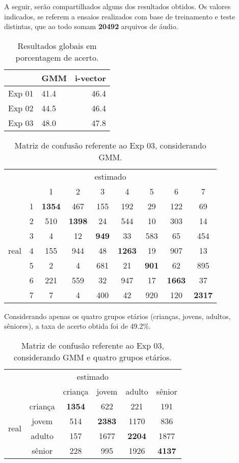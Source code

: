 A seguir, serão compartilhados alguns dos resultados obtidos. Os valores indicados, se referem a ensaios realizados com base de treinamento e teste distintas, que ao todo somam \textbf{20492} arquivos de áudio. 

\begin{table}[!h]
\centering
\begin{tabular}{r|lr}
 & GMM & i-vector \\
\hline
Exp 01 & 41.4 & 46.4 \\
Exp 02 & 44.5 & 46.4 \\
Exp 03 & 48.0 & 47.8 
\end{tabular}
\caption{Resultados globais em porcentagem de acerto.}
\end{table}
\FloatBarrier

\begin{table}[!h]
\centering
\begin{tabular}{ c c | c c c c c c c}
\multicolumn{9}{c}{estimado} \\
 & & 1 & 2 & 3 & 4 & 5 & 6 & 7 \\
\hline
\multirow{7}{*}{real} & 1 & \textbf{1354} & 467 & 155 & 192 & 29 & 122 & 69 \\
& 2 & 510 & \textbf{1398} & 24 & 544 & 10 & 303 & 14 \\
& 3 & 4 & 12 & \textbf{949} & 33 & 583 & 65 & 454 \\
& 4 & 155 & 944 & 48 & \textbf{1263} & 19 & 907 & 13 \\
& 5 & 2 & 4 & 681 & 21 & \textbf{901} & 62 & 895 \\
& 6 & 221 & 559 & 32 & 947 & 17 & \textbf{1663} & 37 \\
& 7 & 7 & 4 & 400 & 42 & 920 & 120 & \textbf{2317}  
\end{tabular}
\caption{Matriz de confusão referente ao Exp 03, considerando GMM.}
\end{table}
\FloatBarrier

Considerando apenas os quatro grupos etários (crianças, jovens, adultos, sêniores), a taxa de acerto obtida foi de 49.2\%.

\begin{table}[!h]
\centering
\begin{tabular}{ c c | c c c c }
\multicolumn{6}{c}{estimado} \\
 & & criança & jovem & adulto & sênior \\
\hline
\multirow{4}{*}{real} & criança & \textbf{1354} & 622 & 221 & 191 \\
& jovem & 514 & \textbf{2383} & 1170 & 836 \\
& adulto & 157 & 1677 & \textbf{2204} & 1877 \\
& sênior & 228 & 995 & 1926 & \textbf{4137} 
\end{tabular}
\caption{Matriz de confusão referente ao Exp 03, considerando GMM e quatro grupos etários.}
\end{table}
\FloatBarrier

